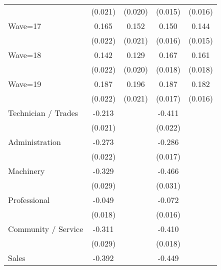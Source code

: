 {\begin{tabular}{l*{4}{c}}
                    &     (0.021)         &     (0.020)         &     (0.015)         &     (0.016)         \\
Wave=17             &       0.165\sym{***}&       0.152\sym{***}&       0.150\sym{***}&       0.144\sym{***}\\
                    &     (0.022)         &     (0.021)         &     (0.016)         &     (0.015)         \\
Wave=18             &       0.142\sym{***}&       0.129\sym{***}&       0.167\sym{***}&       0.161\sym{***}\\
                    &     (0.022)         &     (0.020)         &     (0.018)         &     (0.018)         \\
Wave=19             &       0.187\sym{***}&       0.196\sym{***}&       0.187\sym{***}&       0.182\sym{***}\\
                    &     (0.022)         &     (0.021)         &     (0.017)         &     (0.016)         \\
Technician / Trades &      -0.213\sym{***}&                     &      -0.411\sym{***}&                     \\
                    &     (0.021)         &                     &     (0.022)         &                     \\
Administration      &      -0.273\sym{***}&                     &      -0.286\sym{***}&                     \\
                    &     (0.022)         &                     &     (0.017)         &                     \\
Machinery           &      -0.329\sym{***}&                     &      -0.466\sym{***}&                     \\
                    &     (0.029)         &                     &     (0.031)         &                     \\
Professional        &      -0.049\sym{***}&                     &      -0.072\sym{***}&                     \\
                    &     (0.018)         &                     &     (0.016)         &                     \\
Community / Service &      -0.311\sym{***}&                     &      -0.410\sym{***}&                     \\
                    &     (0.029)         &                     &     (0.018)         &                     \\
Sales               &      -0.392\sym{***}&                     &      -0.449\sym{***}&                     \\

\end{tabular}}
